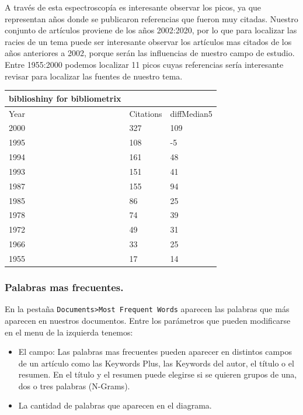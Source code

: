 \documentclass[
]{article}
\begin{document}
A través de esta espectroscopía es interesante observar los picos, ya
que representan años donde se publicaron referencias que fueron muy
citadas. Nuestro conjunto de artículos proviene de los años 2002:2020,
por lo que para localizar las racies de un tema puede ser interesante
observar los artículos mas citados de los años anteriores a 2002, porque
serán las influencias de nuestro campo de estudio. Entre 1955:2000
podemos localizar 11 picos cuyas referencias sería interesante revisar
para localizar las fuentes de nuestro tema.

\begin{longtable}[]{@{}lll@{}}
\toprule
biblioshiny for bibliometrix & & \\
\midrule
\endhead
Year & Citations & diffMedian5 \\
2000 & 327 & 109 \\
1995 & 108 & -5 \\
1994 & 161 & 48 \\
1993 & 151 & 41 \\
1987 & 155 & 94 \\
1985 & 86 & 25 \\
1978 & 74 & 39 \\
1972 & 49 & 31 \\
1966 & 33 & 25 \\
1955 & 17 & 14 \\
\bottomrule
\end{longtable}

\hypertarget{palabras-mas-frecuentes.}{%
\subsubsection{Palabras mas
frecuentes.}\label{palabras-mas-frecuentes.}}

En la pestaña \texttt{Documents\textgreater{}Most\ Frequent\ Words}
aparecen las palabras que más aparecen en nuestros documentos. Entre los
parámetros que pueden modificarse en el menu de la izquierda tenemos:

\begin{itemize}
\item
  El campo: Las palabras mas frecuentes pueden aparecer en distintos
  campos de un artículo como las Keywords Plus, las Keywords del autor,
  el título o el resumen. En el título y el resumen puede elegirse si se
  quieren grupos de una, dos o tres palabras (N-Grams).
\item
  La cantidad de palabras que aparecen en el diagrama.
\end{itemize}
\end{document}
